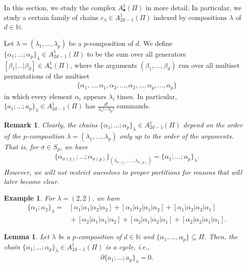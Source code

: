 \documentclass[pdftex]{sigma}
\numberwithin{equation}{section}
\newtheorem{Lemma}[Theorem]{Lemma}
\newtheorem{Example}[Theorem]{Example}
\newtheorem{Remark}[Theorem]{Remark}
\newcommand{\NN }{\mathbb{N}}
\begin{document}
In this section, we study the complex $A^1_\bullet(\Pi)$ in more detail. In particular, we study a certain family of chains $c_\lambda \in A^1_{2d-1}(\Pi)$ indexed by compositions $\lambda$ of $d \in \NN$.

Let $\lambda = (\lambda_1, \dots, \lambda_p)$ be a $p$-composition of $d$. We define $\{\alpha_1;\dots ;\alpha_p\}_\lambda \in A_{2d-1}^1(\Pi)$ to be the sum over all generators $[\beta_1 |\dots |\beta_d] \in A_n^1(\Pi)$, where the arguments $(\beta_1, \dots,\beta_d)$ run over all multiset permutations of the multiset
\begin{align*}
 \{\alpha_1, \dots, \alpha_1,\alpha_2, \dots, \alpha_2, \dots, \alpha_p, \dots , \alpha_p \}
\end{align*}
in which every element $\alpha_i$ appears $\lambda_i$ times. In particular, $\{a_1;\dots ;a_p\}_\lambda \in A_{2d-1}^1(\Pi)$ has $\frac{d!}{\lambda_1! \cdots \lambda_p!}$ summands.

\begin{Remark}\label{rem: symmetric chains don't depend on order of composition}
 Clearly, the chains $\{\alpha_1;\dots ;\alpha_p\}_\lambda \in A_{2d-1}^1(\Pi)$ depend on the order of the $p$-composition $\lambda=(\lambda_1, \dots, \lambda_p)$ only up to the order of the arguments. That is, for $\sigma \in S_p$, we have
 \begin{align*}
 \{\alpha_{\sigma(1)};\dots;\alpha_{\sigma(p)}\}_{(\lambda_{\sigma(1)},\dots,\lambda_{\sigma(p)})}=\{\alpha_1;\dots; \alpha_p\}_\lambda.
 \end{align*}
 However, we will not restrict ourselves to proper partitions for reasons that will later become clear.
\end{Remark}

\begin{Example}
For $\lambda=(2,2)$, we have
\begin{align*}
 \{ \alpha_1; \alpha_2\}_\lambda ={}& [\alpha_1|\alpha_1|\alpha_2|\alpha_2] + [\alpha_1|\alpha_2|\alpha_1|\alpha_2] + [\alpha_1|\alpha_2|\alpha_2|\alpha_1] \\
 &{}+ [\alpha_2|\alpha_1|\alpha_1|\alpha_2] + [\alpha_2|\alpha_1|\alpha_2|\alpha_1] + [\alpha_2|\alpha_2|\alpha_1|\alpha_1].
\end{align*}
\end{Example}

\begin{Lemma}\label{eq: symmetric chains are cycles}
Let $\lambda$ be a $p$-composition of $d \in \NN$ and $\{\alpha_1,\dots,\alpha_p\} \subseteq \Pi$.
Then, the chain $\{\alpha_1;\dots ;\alpha_p\}_\lambda \in A_{2d-1}^1(\Pi)$ is a cycle, i.e.,
\begin{gather*}
 \partial \{a_1;\dots ;a_p\}_\lambda =0.
\end{gather*}
\end{Lemma}
\end{document}
